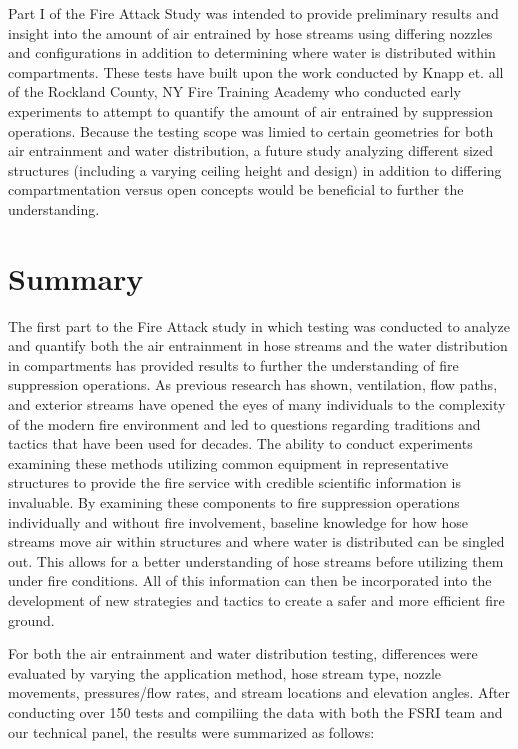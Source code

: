\documentclass{article}
\begin{document}
Part I of the Fire Attack Study was intended to provide preliminary results and insight into the amount of air entrained by hose streams using differing nozzles and configurations in addition to determining where water is distributed within compartments. These tests have built upon the work conducted by Knapp et. all of the Rockland County, NY Fire Training Academy who conducted early experiments to attempt to quantify the amount of air entrained by suppression operations. Because the testing scope was limied to certain geometries for both air entrainment and water distribution, a future study analyzing different sized structures (including a varying ceiling height and design) in addition to differing compartmentation versus open concepts would be beneficial to further the understanding.

\clearpage

\section{Summary}

The first part to the Fire Attack study in which testing was conducted to analyze and quantify both the air entrainment in hose streams and the water distribution in compartments has provided results to further the understanding of fire suppression operations. As previous research has shown, ventilation, flow paths, and exterior streams have opened the eyes of many individuals to the complexity of the modern fire environment and led to questions regarding traditions and tactics that have been used for decades. The ability to conduct experiments examining these methods utilizing common equipment in representative structures to provide the fire service with credible scientific information is invaluable. By examining these components to fire suppression operations individually and without fire involvement, baseline knowledge for how hose streams move air within structures and where water is distributed can be singled out. This allows for a better understanding of hose streams before utilizing them under fire conditions. All of this information can then be incorporated into the development of new strategies and tactics to create a safer and more efficient fire ground.

For both the air entrainment and water distribution testing, differences were evaluated by varying the application method, hose stream type, nozzle movements, pressures/flow rates, and stream locations and elevation angles. After conducting over 150 tests and compiliing the data with both the FSRI team and our technical panel, the results were summarized as follows:
\end{document}
